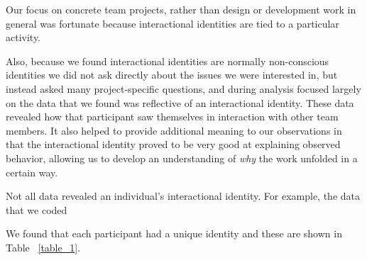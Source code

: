 \documentclass{chi2009}
\begin{document}
Our focus on concrete team projects, rather than design or development work in general was fortunate because interactional identities are tied to a particular activity.  

Also, because we found interactional identities are normally non-conscious identities we did not ask directly about the issues we were interested in, but instead asked many project-specific questions, and during analysis focused largely on the data that we found was reflective of an interactional identity. These data revealed how that participant saw themselves in interaction with other team members. It also helped to provide additional meaning to our observations in that the interactional identity proved to be very good at explaining observed behavior, allowing us to develop an understanding of {\it why} the work unfolded in a certain way.  

Not all data revealed an individual's interactional identity.  For example, the data that we coded 

We found that each participant had a unique identity and these are shown in Table ~\ref{table_1}. 



\end{document}
